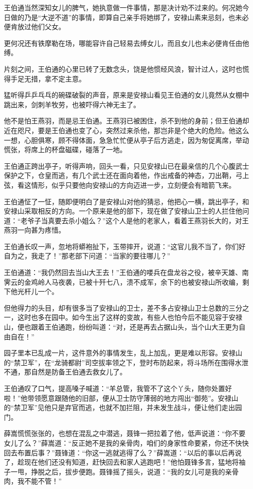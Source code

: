 \documentclass[12pt,oneside]{book}
\begin{document}
王伯通当然深知女儿的脾气，她执意做一件事情，那是决计劝不过来的。何况她今日做的乃是``大逆不道''的事情，即算自己亲手将她绑了，安禄山素来忌刻，也未必便肯放过他们父女。

更何况还有铁摩勒在场，哪能容许自己轻易去缚女儿，而且女儿也未必便肯任由他缚。

片刻之间，王伯通的心里已转了无数念头，饶是他惯经风浪，智计过人，这时也慌得手足无措，拿不定主意。

猛听得乒乒乓乓的碗碟破裂的声音，原来是安禄山看见王伯通的女儿竟然从女棚中跳出来，剑刺羊牧劳，也被吓得六神无主了。

他不是怕王燕羽，而是忌王伯通。王燕羽已被困住，杀不到他的身前；但王伯通却近在咫尺，要是王伯通也变了心，突然过来杀他，那岂非是个绝大的危险。他这么一想，心胆俱寒，顾不得体面，急急忙忙便从亭子后方逃走，因为匆促离席，举动慌张，将席上的杯盘磁碟，碰落了一地。

王伯通正跨出亭子，听得声响，回头一看，只见安禄山已在最亲信的几个心腹武士保护之下，仓皇而逃，有几个武士还在面向着他，作出戒备的神态，刀出鞘，弓上弦，看这情形，似乎只要他向安禄山的方向迈进一步，立刻便会有暗箭飞来。

王伯通怔了一怔，随即便明白了是安禄山对他的猜忌，他把心一横，跳出亭子，和安禄山采取相反的方向。一个原来是他的部下，现在做了安禄山卫士的人拦住他问道：``老爷子当真要去杀小姐么？''这个人是他的老家人，看着王燕羽长大的，对王燕羽一向甚为疼惜。

王伯通长叹一声，忽地将蟒袍扯下，玉带摔开，说道：``这官儿我不当了，你们好自为之，我走了！''那老部下问道：``当家的要往哪儿？''

王伯通道：``我仍然回去当山大王去！''王伯通的喽兵在盘龙谷之役，被辛天雄、南霁云的金鸡岭人马夜袭，已被十歼七八，溃不成军，余下的也被安禄山所收编，剩下他光杆儿一个。

但他得力的头目，却有很多当了安禄山的卫士，差不多占安禄山卫士总数的三分之一，这时也多在园中。如今生出了这样的变故，有些人也怕今后不能见容于安禄山，便也跟着王伯通跑，纷纷叫道：``对，还是再去占据山头，当个山大王更为自由自在！''

园子里本已乱成一片，这件意外的事情发生，乱上加乱，更是难以形容。安禄山的``禁卫军''，在``龙骑都尉''司空拔率领之下，登时布防起来，将斗场所在围得水泄不通，那自然是防备王伯通去救女儿了。

王伯通叹了口气，提高嗓子喊道：``羊总管，我管不了这个丫头，随你处置好啦！''他带领愿意跟随他的旧部，便从卫士防守薄弱的地方闯出``御苑''。安禄山的``禁卫军''见他只是弃官而逃，也就不加拦阻，并未发生战斗，便让他们走出园门。

薛嵩慌慌张张的，也想在混乱之中潜逃，聂锋一把拉着了他，低声说道：``你不要女儿了么？''薛嵩道：``反正她不是我的亲骨肉，咱们的身家性命要紧，你还不快快回去布置后事？''聂锋道：``你这一逃就逃得了么？''薛嵩道：``以后的事以后再说了，趁现在他们还没有知道，赶快回去和家人逃跑吧！''他怕聂锋多言，猛地将袖子一甩，挣脱之后，拔步便跑。聂锋摇了摇头，说道：``我的女儿可是我的亲骨肉，我不能不管！''
\end{document}

